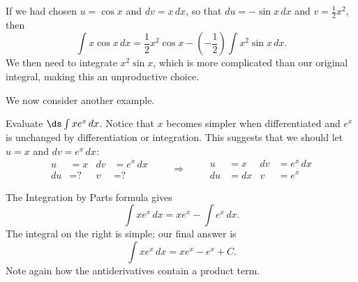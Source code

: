 If we had chosen $u=\cos x$ and $dv=x\, dx$, so that $du=-\sin x\,dx$ and $v=\frac12x^2$, then
\[\int x\cos x\, dx=\frac12x^2\cos x-\left(-\frac12\right)\int x^2\sin x\, dx.\]
We then need to integrate $x^2\sin x$, which is more complicated than our original integral, making this an unproductive choice.



We now consider another example.

\begin{example}\label{ex_ibp2}
Evaluate $\ds\int x e^x\,dx$.
\solution
Notice that $x$ becomes simpler when differentiated and $e^x$ is unchanged by differentiation or integration. This suggests that we should let $u=x$ and $dv=e^x\, dx$:
\[
\begin{aligned}
u&= x & dv&=e^x\, dx\\
du&= \text{?} & v&=\text{?}
\end{aligned}
\qquad\Rightarrow\qquad
\begin{aligned}
u&= x & dv&=e^x\, dx\\
du&= dx & v&=e^x
\end{aligned}
\]

The Integration by Parts formula gives
\[\int x e^x\,dx = xe^x - \int e^x\,dx.\]
The integral on the right is simple; our final answer is
\[\int xe^x\, dx = xe^x - e^x + C.\]
Note again how the antiderivatives contain a product term.
\end{example}


